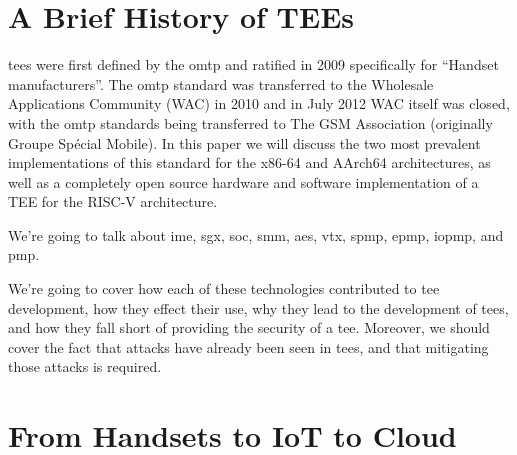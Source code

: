 \section{A Brief History of TEEs}
\glspl{tee} were first defined by the \gls{omtp} and ratified in 2009 \cite{Confidential2009} specifically for ``Handset manufacturers''. The \gls{omtp} standard was transferred to the Wholesale Applications Community (WAC) in 2010 and in July 2012 WAC itself was closed, with the \gls{omtp} standards being transferred to The GSM Association (originally Groupe Spécial Mobile)\cite{WAC}. In this paper we will discuss the two most prevalent implementations of this standard for the x86-64 and AArch64 architectures, as well as a completely open source hardware and software implementation of a TEE for the RISC-V architecture.

We're going to talk about \gls{ime}, \gls{sgx}, \gls{soc}, \gls{smm}, \gls{aes}, \gls{vtx}, \gls{spmp}, \gls{epmp}, \gls{iopmp}, and \gls{pmp}.




 We're going to cover how each of these technologies contributed to \gls{tee} development, how they effect their use, why they lead to the development of \glspl{tee}, and how they fall short of providing the security of a \gls{tee}. Moreover, we should cover the fact that attacks have already been seen in \glspl{tee}, and that mitigating those attacks is required. 

\section{From Handsets to IoT to Cloud}
